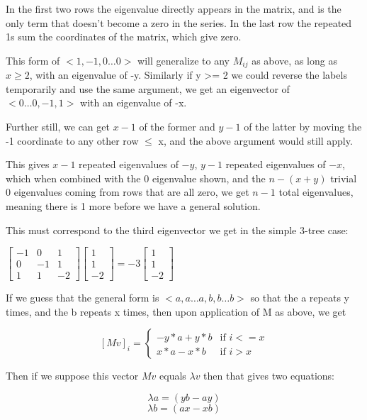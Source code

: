\documentclass{report}
\begin{document}
In the first two rows the eigenvalue directly appears in the matrix, and is the
only term that doesn't become a zero in the series.
In the last row the repeated 1s sum the coordinates of the matrix, which give
zero.

This form of $<1, -1, 0\ldots 0>$ will generalize to any $M_{ij}$ as above, as
long as $x \geq 2$, with an eigenvalue of -y.
Similarly if y >= 2 we could reverse the labels temporarily and use the same
argument, we get an eigenvector of $<0\ldots 0, -1, 1>$ with an eigenvalue of
-x.

Further still, we can get $x-1$ of the former and $y-1$ of the latter by moving
the -1 coordinate to any other row $\leq$ x, and the above argument would still
apply.

This gives $x-1$ repeated eigenvalues of $-y$, $y-1$ repeated eigenvalues of $-x$,
which when combined with the 0 eigenvalue shown, and the $n - (x + y)$ trivial $0$
eigenvalues coming from rows that are all zero, we get $n-1$ total eigenvalues,
meaning there is 1 more before we have a general solution.

This must correspond to the third eigenvector we get in the simple 3-tree case:

$
\left[\begin{matrix}
	-1 & 0 & 1\\
	0 & -1 & 1\\
	1 & 1 & -2
\end{matrix}\right]
\left[\begin{matrix}
	1\\
	1\\
	-2
\end{matrix}\right]
=
-3
\left[\begin{matrix}
	1\\
	1\\
	-2
\end{matrix}\right]
$

If we guess that the general form is $<a, a\ldots a, b, b\ldots b>$ so that the
a repeats y times, and the b repeats x times, then upon application of M as
above, we get

\[ {[Mv]}_i = \begin{cases}
	-y*a + y*b & \text{if } i <= x\\
	x*a - x*b & \text{if } i > x
\end{cases} \]

Then if we suppose this vector $Mv$ equals $\lambda v$ then that gives two
equations:

\begin{equation}
	\lambda a = (yb - ay)
\end{equation}
\begin{equation*}
	\lambda b = (ax - xb)
\end{equation*}
\end{document}
